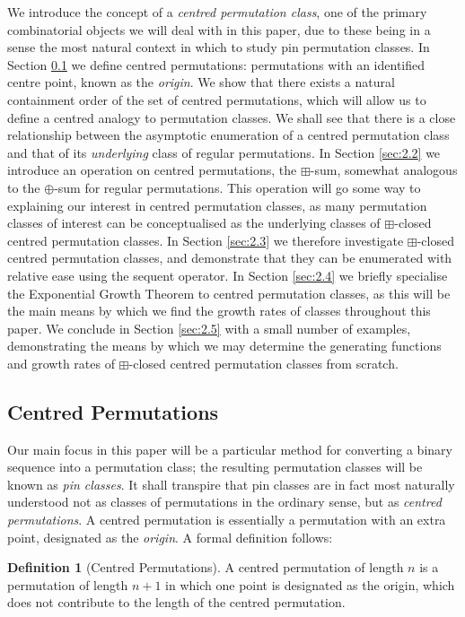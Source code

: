 \documentclass[11pt,a4paper]{article}
\theoremstyle{definition}
\newtheorem{defn}[thm]{Definition}
\begin{document}
We introduce the concept of a  \emph{centred permutation class}, one of the primary combinatorial objects we will deal with in this paper, due to these being in a sense the most natural context in which to study pin permutation classes. In Section \ref{sec:2.1} we define centred permutations: permutations with an identified centre point, known as the \emph{origin}. We show that there exists a natural containment order of the set of centred permutations, which will allow us to define a centred analogy to permutation classes. We shall see that there is a close relationship between the asymptotic enumeration of a centred permutation class and that of its \emph{underlying} class of regular permutations. In Section \ref{sec:2.2} we introduce an operation on centred permutations, the $\boxplus$-sum, somewhat analogous to the $\oplus$-sum for regular permutations. This operation will go some way to explaining our interest in centred permutation classes, as many permutation classes of interest can be conceptualised as the underlying classes of $\boxplus$-closed centred permutation classes. In Section \ref{sec:2.3} we therefore investigate $\boxplus$-closed centred permutation classes, and demonstrate that they can be enumerated with relative ease using the sequent operator. In Section \ref{sec:2.4} we briefly specialise the Exponential Growth Theorem to centred permutation classes, as this will be the main means by which we find the growth rates of classes throughout this paper. We conclude in Section \ref{sec:2.5} with a small number of examples, demonstrating the means by which we may determine the generating functions and growth rates of $\boxplus$-closed centred permutation classes from scratch.

\subsection{Centred Permutations} \label{sec:2.1}

Our main focus in this paper will be a particular method for converting a binary sequence into a permutation class; the resulting permutation classes will be known as \emph{pin classes}. It shall transpire that pin classes are in fact most naturally understood not as classes of permutations in the ordinary sense, but as \emph{centred permutations}. A centred permutation is essentially a permutation with an extra point, designated as the \emph{origin}. A formal definition follows:

\begin{defn}[Centred Permutations]
A centred permutation of length $n$ is a permutation of length $n+1$ in which one point is designated as the origin, which does not contribute to the length of the centred permutation.
\end{defn}
\end{document}
